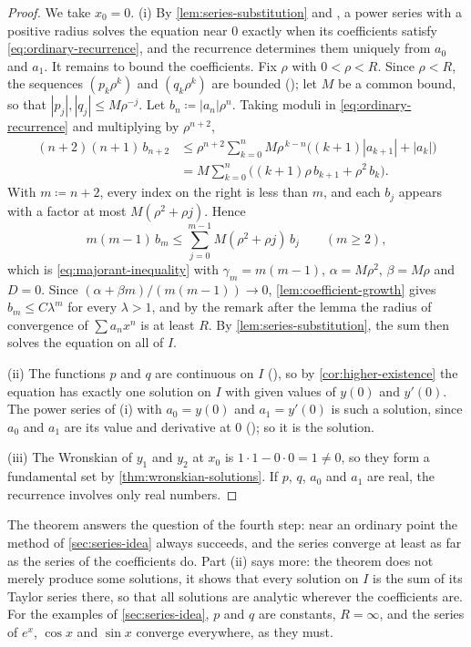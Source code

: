 \begin{proof}
We take $x_0=0$. (i) By \cref{lem:series-substitution} and , a power series with a positive radius solves the equation near $0$ exactly when its coefficients satisfy \eqref{eq:ordinary-recurrence}, and the recurrence determines them uniquely from $a_0$ and $a_1$. It remains to bound the coefficients. Fix $\rho$ with $0<\rho<R$. Since $\rho<R$, the sequences $(p_k\rho^k)$ and $(q_k\rho^k)$ are bounded (); let $M$ be a common bound, so that $|p_j|,|q_j|\le M\rho^{-j}$. Let $b_n\coloneqq|a_n|\rho^n$. Taking moduli in \eqref{eq:ordinary-recurrence} and multiplying by $\rho^{n+2}$,
\begin{align*}
(n+2)(n+1)\,b_{n+2}&\le\rho^{n+2}\sum_{k=0}^nM\rho^{\,k-n}\bigl((k+1)|a_{k+1}|+|a_k|\bigr)\\
&=M\sum_{k=0}^n\bigl((k+1)\rho\,b_{k+1}+\rho^2\,b_k\bigr).
\end{align*}
With $m\coloneqq n+2$, every index on the right is less than $m$, and each $b_j$ appears with a factor at most $M(\rho^2+\rho j)$. Hence
\[
m(m-1)\,b_m\le\sum_{j=0}^{m-1}M(\rho^2+\rho j)\,b_j\qquad(m\ge2),
\]
which is \eqref{eq:majorant-inequality} with $\gamma_m=m(m-1)$, $\alpha=M\rho^2$, $\beta=M\rho$ and $D=0$. Since $(\alpha+\beta m)/(m(m-1))\to0$, \cref{lem:coefficient-growth} gives $b_m\le C\lambda^m$ for every $\lambda>1$, and by the remark after the lemma the radius of convergence of $\sum a_nx^n$ is at least $R$. By \cref{lem:series-substitution}, the sum then solves the equation on all of $I$.

(ii) The functions $p$ and $q$ are continuous on $I$ (), so by \cref{cor:higher-existence} the equation has exactly one solution on $I$ with given values of $y(0)$ and $y'(0)$. The power series of (i) with $a_0=y(0)$ and $a_1=y'(0)$ is such a solution, since $a_0$ and $a_1$ are its value and derivative at $0$ (); so it is the solution.

(iii) The Wronskian of $y_1$ and $y_2$ at $x_0$ is $1\cdot1-0\cdot0=1\ne0$, so they form a fundamental set by \cref{thm:wronskian-solutions}. If $p$, $q$, $a_0$ and $a_1$ are real, the recurrence involves only real numbers.
\end{proof}

The theorem answers the question of the fourth step: near an ordinary point the method of \cref{sec:series-idea} always succeeds, and the series converge at least as far as the series of the coefficients do. Part (ii) says more: the theorem does not merely produce some solutions, it shows that every solution on $I$ is the sum of its Taylor series there, so that all solutions are analytic wherever the coefficients are. For the examples of \cref{sec:series-idea}, $p$ and $q$ are constants, $R=\infty$, and the series of $e^x$, $\cos x$ and $\sin x$ converge everywhere, as they must.

